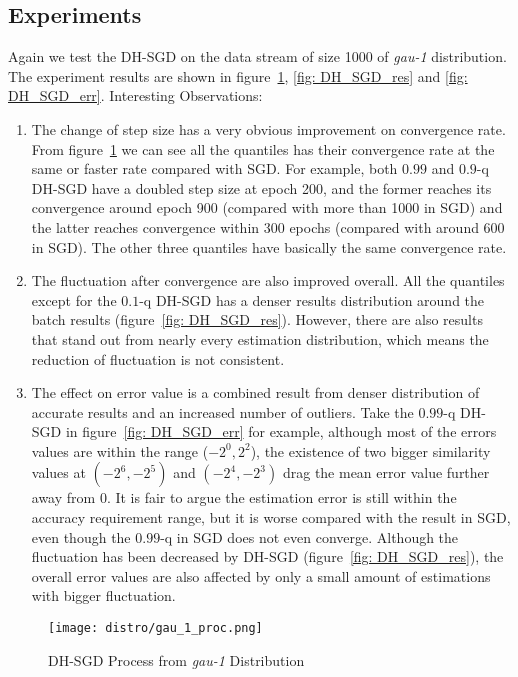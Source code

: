 \subsection{Experiments}
\graphicspath{{Figures/Stepsize_adapt/Adaptive_stepsize/}{./}} 
\label{subsec: DB_SGD_exp}
Again we test the DH-SGD on the data stream of size 1000 of \textit{gau-1} distribution. The experiment results are shown in figure~\ref{fig: DH_SGD_proc}, \ref{fig: DH_SGD_res} and \ref{fig: DH_SGD_err}.
Interesting Observations:
\begin{enumerate}
    \item The change of step size has a very obvious improvement on convergence rate. From figure~\ref{fig: DH_SGD_proc}  we can see all the quantiles has their convergence rate at the same or faster rate compared with SGD. For example, both $0.99$ and $0.9$-q DH-SGD have a doubled step size at epoch 200, and the former reaches its convergence around epoch 900 (compared with more than 1000 in SGD) and the latter reaches convergence within 300 epochs (compared with around 600 in SGD). The other three quantiles have basically the same convergence rate.
    
    \item The fluctuation after convergence are also improved overall. All the quantiles except for the $0.1$-q DH-SGD has a denser results distribution around the batch results (figure~\ref{fig: DH_SGD_res}). However, there are also results that stand out from nearly every estimation distribution, which means the reduction of fluctuation is not consistent.
    
    \item The effect on error value is a combined result from denser distribution of accurate results and an increased number of outliers. Take the $0.99$-q DH-SGD in figure~\ref{fig: DH_SGD_err} for example, although most of the errors values are within the range ($-2^0, 2^2$), the existence of two bigger similarity values at $(-2^6, -2^5)$ and $(-2^4, -2^3)$ drag the mean error value further away from $0$. It is fair to argue the estimation error is still within the accuracy requirement range, but it is worse compared with the result in SGD, even though the $0.99$-q in SGD does not even converge. Although the fluctuation has been decreased by DH-SGD (figure~\ref{fig: DH_SGD_res}), the overall error values are also affected by only a small amount of estimations with bigger fluctuation. 
\end{enumerate}

\begin{figure}[H]
    \centering
	\texttt{[image: distro/gau\_1\_proc.png]}
    \caption{DH-SGD Process from \textit{gau-1} Distribution}
    \label{fig: DH_SGD_proc}
\end{figure}


